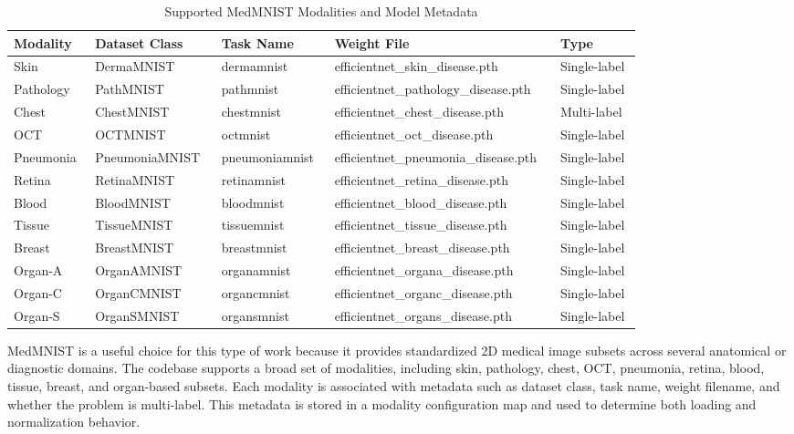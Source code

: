 \documentclass[conference]{IEEEtran}
\begin{document}
\begin{table}[t]
\centering
\caption{Supported MedMNIST Modalities and Model Metadata}
\label{tab:modalities}
\begin{tabular}{p{0.12\linewidth} p{0.18\linewidth} p{0.16\linewidth} p{0.22\linewidth} p{0.12\linewidth}}
\toprule
\textbf{Modality} & \textbf{Dataset Class} & \textbf{Task Name} & \textbf{Weight File} & \textbf{Type} \\
\midrule
Skin & DermaMNIST & dermamnist & efficientnet\_skin\_disease.pth & Single-label \\
Pathology & PathMNIST & pathmnist & efficientnet\_pathology\_disease.pth & Single-label \\
Chest & ChestMNIST & chestmnist & efficientnet\_chest\_disease.pth & Multi-label \\
OCT & OCTMNIST & octmnist & efficientnet\_oct\_disease.pth & Single-label \\
Pneumonia & PneumoniaMNIST & pneumoniamnist & efficientnet\_pneumonia\_disease.pth & Single-label \\
Retina & RetinaMNIST & retinamnist & efficientnet\_retina\_disease.pth & Single-label \\
Blood & BloodMNIST & bloodmnist & efficientnet\_blood\_disease.pth & Single-label \\
Tissue & TissueMNIST & tissuemnist & efficientnet\_tissue\_disease.pth & Single-label \\
Breast & BreastMNIST & breastmnist & efficientnet\_breast\_disease.pth & Single-label \\
Organ-A & OrganAMNIST & organamnist & efficientnet\_organa\_disease.pth & Single-label \\
Organ-C & OrganCMNIST & organcmnist & efficientnet\_organc\_disease.pth & Single-label \\
Organ-S & OrganSMNIST & organsmnist & efficientnet\_organs\_disease.pth & Single-label \\
\bottomrule
\end{tabular}
\end{table}

MedMNIST is a useful choice for this type of work because it provides standardized 2D medical image subsets across several anatomical or diagnostic domains. The codebase supports a broad set of modalities, including skin, pathology, chest, OCT, pneumonia, retina, blood, tissue, breast, and organ-based subsets. Each modality is associated with metadata such as dataset class, task name, weight filename, and whether the problem is multi-label. This metadata is stored in a modality configuration map and used to determine both loading and normalization behavior.
\end{document}
